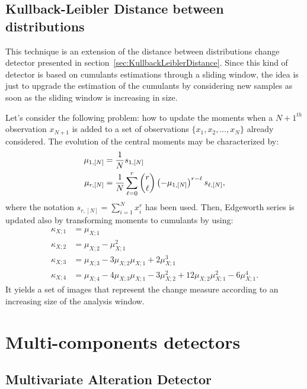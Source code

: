 \subsection{Kullback-Leibler Distance between distributions}
\label{sec:KullbackLeiblerProfile}

This technique is an extension of the distance between distributions 
change detector presented in section~\ref{sec:KullbackLeiblerDistance}.
Since this kind of detector is based on cumulants estimations through
a sliding window, the idea is just to upgrade the estimation of the cumulants
by considering new samples as soon as the sliding window is increasing in size.

Let's consider the following problem: how to update the moments when a
$N+1^{th}$ observation $x_{N+1}$ is added to a set of observations $\{x_1, x_2, \ldots,
x_N\}$ already considered.
The evolution of the central moments may be characterized by:
\begin{align}\label{eqMomentN}
	\mu_{1,[N]} & = \frac{1}{N} s_{1,[N]} \\
	\mu_{r,[N]} & = \frac{1}{N} \sum_{\ell = 0}^r \binom{r}{\ell} 
									\left( -\mu_{1,[N]} \right)^{r-\ell}
									s_{\ell,[N]}, \notag
\end{align}
where the
notation $s_{r,[N]} = \sum_{i=1}^N x_i^r$ has been used.
Then, Edgeworth series is updated also by transforming moments to
cumulants by using:
\begin{equation}\label{eqCumsMoms}
  \begin{split}
\kappa_{X;1} &= \mu_{X;1}\\
\kappa_{X;2} &= \mu_{X;2}-\mu_{X;1}^2\\
\kappa_{X;3} &= \mu_{X;3} - 3\mu_{X;2} \mu_{X;1} + 2\mu_{X;1}^3\\
\kappa_{X;4} &= \mu_{X;4} - 4\mu_{X;3} \mu_{X;1} - 3\mu_{X;2}^2 + 12 \mu_{X;2} \mu_{X;1}^2 - 6\mu_{X;1}^4.
  \end{split}
\end{equation}
It yields a set of images that represent the change measure according to an
increasing size of the analysis window.



\section{Multi-components detectors}

\subsection{Multivariate Alteration Detector}





